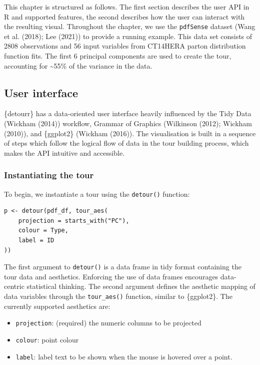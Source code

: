 This chapter is structured as follows. The first section describes the user API in R and supported features, the second describes how the user can interact with the resulting visual. Throughout the chapter, we use the \texttt{pdfSense} dataset (Wang et al. (2018); Lee (2021)) to provide a running example. This data set consists of 2808 observations and 56 input variables from CT14HERA parton distribution function fits. The first 6 principal components are used to create the tour, accounting for \textasciitilde55\% of the variance in the data.

\hypertarget{user-interface}{%
\subsection{User interface}\label{user-interface}}

\{detourr\} has a data-oriented user interface heavily influenced by the Tidy Data (Wickham (2014)) workflow, Grammar of Graphics (Wilkinson (2012); Wickham (2010)), and \{ggplot2\} (Wickham (2016)). The visualisation is built in a sequence of steps which follow the logical flow of data in the tour building process, which makes the API intuitive and accessible.

\hypertarget{instantiating-the-tour}{%
\subsubsection{Instantiating the tour}\label{instantiating-the-tour}}

To begin, we instantiate a tour using the \texttt{detour()} function:

\begin{verbatim}
p <- detour(pdf_df, tour_aes(
    projection = starts_with("PC"),
    colour = Type,
    label = ID
))
\end{verbatim}

The first argument to \texttt{detour()} is a data frame in tidy format containing the tour data and aesthetics. Enforcing the use of data frames encourages data-centric statistical thinking. The second argument defines the aesthetic mapping of data variables through the \texttt{tour\_aes()} function, similar to \{ggplot2\}. The currently supported aesthetics are:

\begin{itemize}
\tightlist
\item
  \texttt{projection}: (required) the numeric columns to be projected
\item
  \texttt{colour}: point colour
\item
  \texttt{label}: label text to be shown when the mouse is hovered over a point.
\end{itemize}

